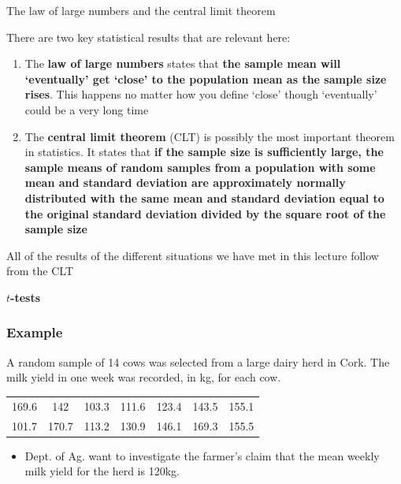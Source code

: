 \documentclass[12pt,xcolor=dvipsnames,handout,mathserif,aspectratio=169]{beamer}
\newcommand{\bbl}[1]{{\color{NavyBlue} \textbf{#1}}}
\newcommand{\bre}[1]{{\color{red} \textbf{#1}}}
\newcommand{\bgr}[1]{{\color{PineGreen} \textbf{#1}}}
\begin{document}
\begin{frame}{The law of large numbers and the central limit theorem}

There are two key statistical results that are relevant here:
\begin{enumerate}
\item The \bre{law of large numbers} states that \bgr{the sample mean will `eventually' get `close' to the population mean as the sample size rises}. This happens no matter how you define `close' though `eventually' could be a very long time
\pause
\item The \bre{central limit theorem} (CLT) is possibly the most important theorem in statistics. It states that \bgr{if the sample size is sufficiently large, the sample means of random samples from a population with some mean and standard deviation are approximately normally distributed with the same mean and standard deviation equal to the original standard deviation divided by the square root of the sample size}
\end{enumerate}
All of the results of the different situations we have met in this lecture follow from the CLT
\end{frame}

\begin{frame}[fragile]{}
\bbl{\Huge $t$-tests}\\ 
\vspace{0.5cm}
\end{frame}

\begin{frame}\frametitle{Example}
A random sample of 14 cows was selected from a large dairy herd in Cork. The milk yield in one week was recorded, in kg, for each cow. \\
\vspace{0.5cm}
\begin{tabular}{ccccccc}
169.6&142&103.3&111.6&123.4&143.5&155.1\\
101.7&170.7&113.2&130.9&146.1&169.3&155.5
\end{tabular}
\vspace{0.5cm}

\begin{itemize}
\item Dept. of Ag. want to investigate the farmer's claim that the mean weekly milk yield for the herd is 120kg.
\end{itemize}
\end{frame}
\end{document}
